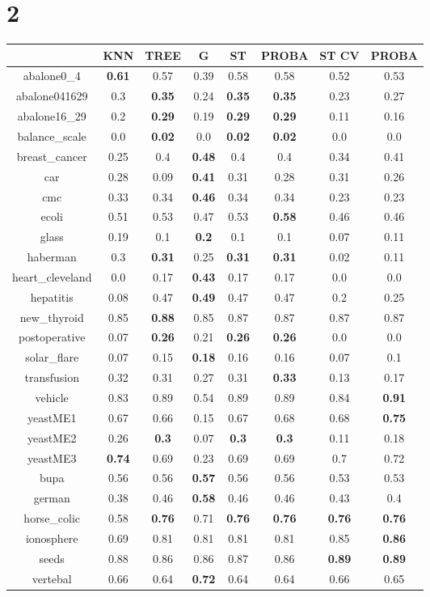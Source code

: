 \documentclass{article}%
\begin{document}
%
\section*{2}%
\begin{tabular}{c|ccccccc}%
\hline%
&KNN&TREE&G&ST&PROBA&ST CV&PROBA\\%
\hline%
abalone0\_4&\textbf{0.61}&0.57&0.39&0.58&0.58&0.52&0.53\\%
\hline%
abalone041629&0.3&\textbf{0.35}&0.24&\textbf{0.35}&\textbf{0.35}&0.23&0.27\\%
\hline%
abalone16\_29&0.2&\textbf{0.29}&0.19&\textbf{0.29}&\textbf{0.29}&0.11&0.16\\%
\hline%
balance\_scale&0.0&\textbf{0.02}&0.0&\textbf{0.02}&\textbf{0.02}&0.0&0.0\\%
\hline%
breast\_cancer&0.25&0.4&\textbf{0.48}&0.4&0.4&0.34&0.41\\%
\hline%
car&0.28&0.09&\textbf{0.41}&0.31&0.28&0.31&0.26\\%
\hline%
cmc&0.33&0.34&\textbf{0.46}&0.34&0.34&0.23&0.23\\%
\hline%
ecoli&0.51&0.53&0.47&0.53&\textbf{0.58}&0.46&0.46\\%
\hline%
glass&0.19&0.1&\textbf{0.2}&0.1&0.1&0.07&0.11\\%
\hline%
haberman&0.3&\textbf{0.31}&0.25&\textbf{0.31}&\textbf{0.31}&0.02&0.11\\%
\hline%
heart\_cleveland&0.0&0.17&\textbf{0.43}&0.17&0.17&0.0&0.0\\%
\hline%
hepatitis&0.08&0.47&\textbf{0.49}&0.47&0.47&0.2&0.25\\%
\hline%
new\_thyroid&0.85&\textbf{0.88}&0.85&0.87&0.87&0.87&0.87\\%
\hline%
postoperative&0.07&\textbf{0.26}&0.21&\textbf{0.26}&\textbf{0.26}&0.0&0.0\\%
\hline%
solar\_flare&0.07&0.15&\textbf{0.18}&0.16&0.16&0.07&0.1\\%
\hline%
transfusion&0.32&0.31&0.27&0.31&\textbf{0.33}&0.13&0.17\\%
\hline%
vehicle&0.83&0.89&0.54&0.89&0.89&0.84&\textbf{0.91}\\%
\hline%
yeastME1&0.67&0.66&0.15&0.67&0.68&0.68&\textbf{0.75}\\%
\hline%
yeastME2&0.26&\textbf{0.3}&0.07&\textbf{0.3}&\textbf{0.3}&0.11&0.18\\%
\hline%
yeastME3&\textbf{0.74}&0.69&0.23&0.69&0.69&0.7&0.72\\%
\hline%
bupa&0.56&0.56&\textbf{0.57}&0.56&0.56&0.53&0.53\\%
\hline%
german&0.38&0.46&\textbf{0.58}&0.46&0.46&0.43&0.4\\%
\hline%
horse\_colic&0.58&\textbf{0.76}&0.71&\textbf{0.76}&\textbf{0.76}&\textbf{0.76}&\textbf{0.76}\\%
\hline%
ionosphere&0.69&0.81&0.81&0.81&0.81&0.85&\textbf{0.86}\\%
\hline%
seeds&0.88&0.86&0.86&0.87&0.86&\textbf{0.89}&\textbf{0.89}\\%
\hline%
vertebal&0.66&0.64&\textbf{0.72}&0.64&0.64&0.66&0.65\\%
\hline%
\end{tabular}
\end{document}
